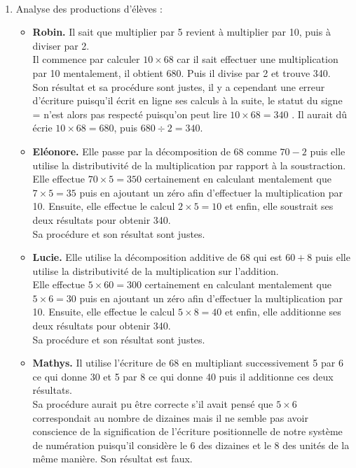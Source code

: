 \begin{corrige}
\ \\ [-5mm]
\begin{enumerate}
   \item Analyse des productions d'élèves :
   \begin{itemize}
      \item {\bf Robin.} Il sait que multiplier par 5 revient à multiplier par 10, puis à diviser par 2. \\
      Il commence par calculer $10\times68$ car il sait effectuer une multiplication par 10 mentalement, il obtient 680. Puis il divise par 2 et trouve 340. \\
      Son résultat et sa procédure sont justes, il y a cependant une erreur d'écriture puisqu'il écrit en ligne ses calculs à la suite, le statut du signe \og = \fg{} n'est alors pas respecté puisqu'on peut lire \og $10\times68 =340$ \fg. Il aurait dû écrie $10\times68 =680$, puis $680\div2 =340$.
      \item {\bf Eléonore.} Elle passe par la décomposition de 68 comme $70-2$ puis elle utilise la distributivité de la multiplication par rapport à la soustraction. \\
      Elle effectue $70\times5 =350$ certainement en calculant mentalement que $7\times5 =35$ puis en \og ajoutant un zéro \fg{} afin d'effectuer la multiplication par 10. Ensuite, elle effectue le calcul $2\times 5 =10$ et enfin, elle soustrait ses deux résultats pour obtenir 340. \\
      Sa procédure et son résultat sont justes.
      \item {\bf Lucie.} Elle utilise la décomposition additive de 68 qui est $60+8$ puis elle utilise la distributivité de la multiplication sur l'addition. \\
      Elle effectue $5\times60 =300$ certainement en calculant mentalement que $5\times6 =30$ puis en \og ajoutant un zéro \fg{} afin d'effectuer la multiplication par 10. Ensuite, elle effectue le calcul $5\times8 =40$ et enfin, elle additionne ses deux résultats pour obtenir 340. \\
      Sa procédure et son résultat sont justes.
      \item {\bf Mathys.} Il utilise l'écriture de 68 en multipliant successivement 5 par 6 ce qui donne 30 et 5 par 8 ce qui donne 40 puis il additionne ces deux résultats. \\
      Sa procédure aurait pu être correcte s'il avait pensé que $5\times6$ correspondait au nombre de dizaines mais il ne semble pas avoir conscience de la signification de l'écriture positionnelle de notre système de numération puisqu'il considère le 6 des dizaines et le 8 des unités de la même manière. Son résultat est faux.

\end{itemize}
\end{enumerate}
\end{corrige}
